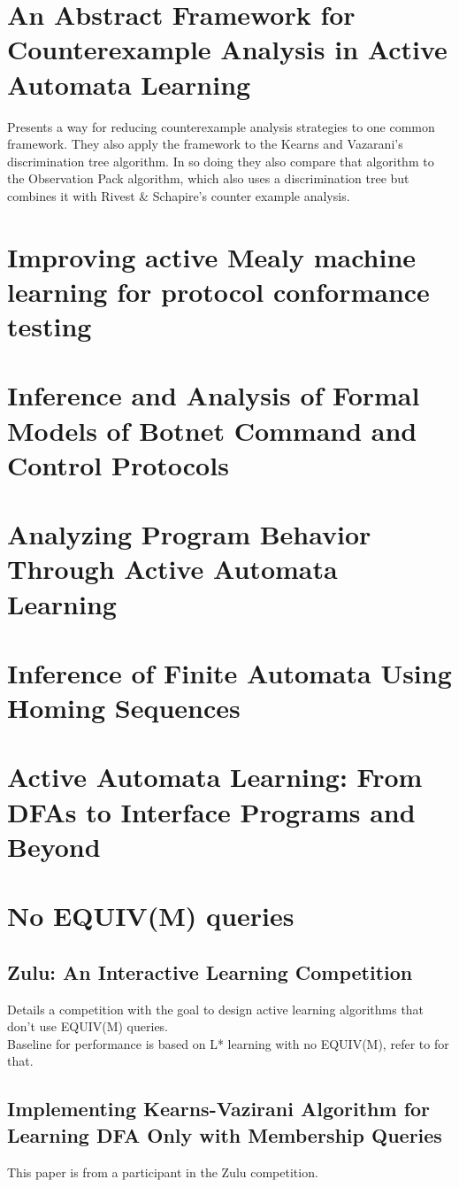 \documentclass[11pt]{article}
\begin{document}
\section{An Abstract Framework for Counterexample Analysis in Active Automata Learning\cite{Isberner14a}}
Presents a way for reducing counterexample analysis strategies to one common
framework. They also apply the framework to the Kearns and Vazarani's
discrimination tree algorithm\cite{Kearns94}. In so doing they also compare that
algorithm to the Observation Pack algorithm, which also uses a discrimination
tree but combines it with Rivest \& Schapire's counter example
analysis\cite{Rivest93}.

\section{\cite{Aarts13} Improving active Mealy machine learning for protocol conformance testing}
\section{\cite{Cho10} Inference and Analysis of Formal Models of Botnet Command and Control Protocols}
\section{\cite{Bauer14} Analyzing Program Behavior Through Active Automata Learning}
\section{\cite{Rivest93} Inference of Finite Automata Using Homing Sequences}
\section{\cite{Steffen12} Active Automata Learning: From DFAs to Interface Programs and Beyond}

\section{No EQUIV(M) queries}
\subsection{\cite{Combe10} Zulu: An Interactive Learning Competition}
Details a competition with the goal to design active learning algorithms that don't use EQUIV(M) queries. \\
Baseline for performance is based on L* learning with no EQUIV(M), refer to \cite{Angluin87} for that.
\subsection{\cite{Balle10} Implementing Kearns-Vazirani Algorithm for Learning DFA Only with Membership Queries}
This paper is from a participant in the Zulu competition.

{}

\end{document}
